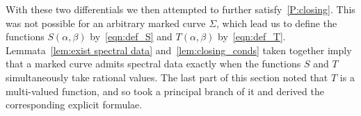With these two differentials we then attempted to further satisfy~\ref{P:closing}. This was not possible for an arbitrary marked curve $Σ$, which lead us to define the functions $S(α,β)$ by~\eqref{eqn:def_S} and $T(α,β)$ by~\eqref{eqn:def_T}. Lemmata~\ref{lem:exist spectral data} and~\ref{lem:closing_conds} taken together imply that a marked curve admits spectral data exactly when the functions $S$ and $T$ simultaneously take rational values. The last part of this section noted that $T$ is a multi-valued function, and so took a principal branch of it and derived the corresponding explicit formulae.

%
%









